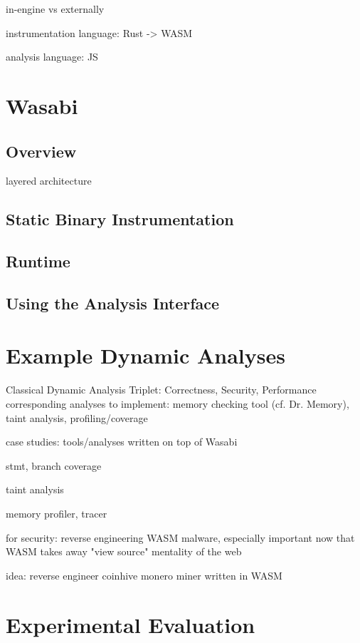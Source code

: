 \documentclass[sigplan,review,anonymous]{acmart}\settopmatter{printfolios=true,printccs=false,printacmref=false}
\newcommand{\name}{Wasabi}
\begin{document}
in-engine vs externally

instrumentation language: Rust -> WASM

analysis language: JS

\newpage
\section {Wasabi}
\label{sec:wasabi}

\subsection{Overview}
\label{sec:overview}

layered architecture

\subsection{Static Binary Instrumentation}
\label{sec:instrumentation}

\subsection{Runtime}
\label{sec:runtime}

\subsection{Using the Analysis Interface}
\label{sec:interface}

\newpage
\section{Example Dynamic Analyses}
\label{sec:examples}

Classical Dynamic Analysis Triplet: Correctness, Security, Performance
corresponding analyses to implement: memory checking tool (cf. Dr. Memory), taint analysis, profiling/coverage

case studies: tools/analyses written on top of \name

stmt, branch coverage

taint analysis

memory profiler, tracer

for security: reverse engineering WASM malware, especially important now that WASM takes away "view source" mentality of the web

idea: reverse engineer coinhive monero miner written in WASM

\newpage
\section{Experimental Evaluation}
\label{sec:experiments}
\end{document}
